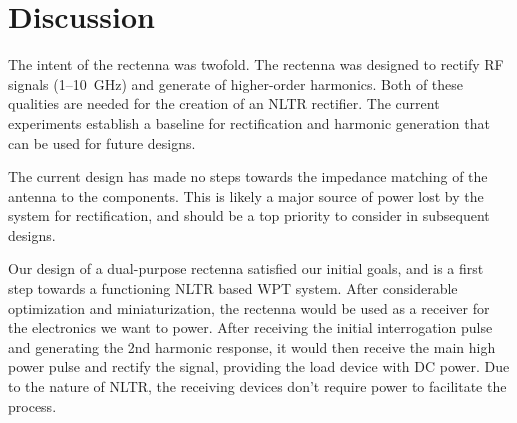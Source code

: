 \section{Discussion}
\label{sec:rectenna-discussion}

The intent of the rectenna was twofold. The rectenna was designed to rectify RF signals (\numrange{1}{10}~GHz) and generate of higher-order harmonics. Both of these qualities are needed for the creation of an NLTR rectifier. The current experiments establish a baseline for rectification and harmonic generation that can be used for future designs.

The current design has made no steps towards the impedance matching of the antenna to the components. This is likely a major source of power lost by the system for rectification, and should be a top priority to consider in subsequent designs.

Our design of a dual-purpose rectenna satisfied our initial goals, and is a first step towards a functioning NLTR based WPT system. After considerable optimization and miniaturization, the rectenna would be used as a receiver for the electronics we want to power. After receiving the initial interrogation pulse and generating the 2nd harmonic response, it would then receive the main high power pulse and rectify the signal, providing the load device with DC power. Due to the nature of NLTR, the receiving devices don’t require power to facilitate the process.
